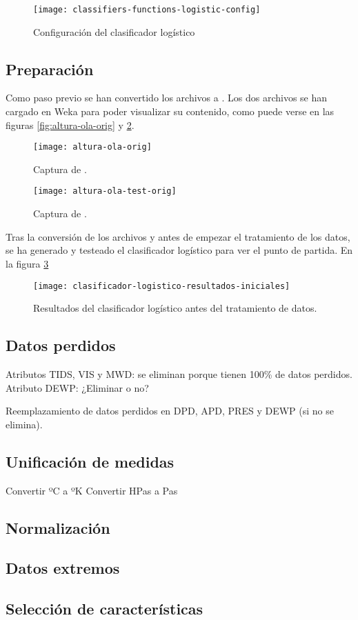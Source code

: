 \begin{figure}[ht]
    \centering
    \texttt{[image: classifiers-functions-logistic-config]}
    \caption{Configuración del clasificador logístico}
    \label{fig:classifiers-functions-logistic-config}
\end{figure}

\subsection{Preparación}
Como paso previo se han convertido los archivos  a . Los dos archivos se han cargado en Weka para poder visualizar su contenido, como puede verse en las figuras \ref{fig:altura-ola-orig} y \ref{fig:altura-ola-test-orig}.

\begin{figure}[H]
    \centering
    \begin{minipage}{0.5\textwidth}
        \centering
        \texttt{[image: altura-ola-orig]}
        \caption{Captura de .}
        \label{fig:altura-ola-orig}
    \end{minipage}\hfill
    \begin{minipage}{0.5\textwidth}
        \centering
        \texttt{[image: altura-ola-test-orig]}
        \caption{Captura de .}
        \label{fig:altura-ola-test-orig}
    \end{minipage}
\end{figure}

Tras la conversión de los archivos y antes de empezar el tratamiento de los datos, se ha generado y testeado el clasificador logístico para ver el punto de partida. En la figura \ref{fig:clasificador-logistico-resultados-inciiales}

\begin{figure}[ht]
    \centering
    \texttt{[image: clasificador-logistico-resultados-iniciales]}
    \caption{Resultados del clasificador logístico antes del tratamiento de datos.}
    \label{fig:clasificador-logistico-resultados-inciiales}
\end{figure}

\subsection{Datos perdidos}
Atributos TIDS, VIS y MWD: se eliminan porque tienen 100\% de datos perdidos.
Atributo DEWP: ¿Eliminar o no?

Reemplazamiento de datos perdidos en DPD, APD, PRES y DEWP (si no se elimina).

\subsection{Unificación de medidas}
Convertir ºC a ºK
Convertir HPas a Pas

\subsection{Normalización}


\subsection{Datos extremos}


\subsection{Selección de características}


